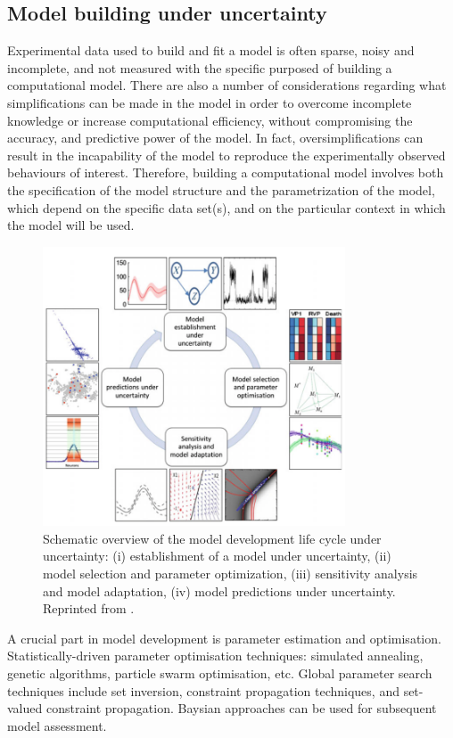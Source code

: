 \documentclass[12pt]{article}
\begin{document}
 
 \subsection{Model building under uncertainty}
 
 Experimental data used to build and fit a model is often sparse, noisy and incomplete, and not measured with the specific purposed of building a computational model. There are also a number of considerations regarding what simplifications can be made in the model in order to overcome incomplete knowledge or increase computational efficiency, without compromising the accuracy, and predictive power of the model. In fact, oversimplifications can result in the incapability of the model to reproduce the experimentally observed behaviours of interest. Therefore, building a computational model involves both the specification of the model structure and the parametrization of the model, which depend  on the specific data set(s), and on the particular context in which the model will be used. 
 
 \begin{figure}[h]
 	\centering
    \includegraphics[width=0.8\textwidth]{images/model_cycle.png}
    \caption{Schematic overview of the model development life cycle under uncertainty: (i) establishment of a model under uncertainty, (ii) model selection and parameter optimization, (iii) sensitivity analysis and model adaptation, (iv) model predictions under uncertainty.  Reprinted from \cite{Uncertaintybiology}.}
    \label{fig:model_cycle}
\end{figure}
  
 A crucial part in model development is parameter estimation and optimisation. Statistically-driven parameter optimisation techniques: simulated annealing, genetic algorithms, particle swarm optimisation, etc. Global parameter search techniques include set inversion, constraint propagation techniques, and set-valued constraint propagation. Baysian approaches can be used for subsequent model assessment.
  
\end{document}
